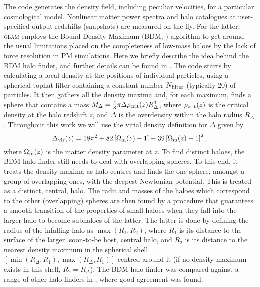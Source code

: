 The code generates the density field, including peculiar velocities, for a particular cosmological model. Nonlinear matter power spectra and halo catalogues at user-specified output redshifts (snapshots) are measured on the fly. For the latter, \textsc{glam} employs the Bound Density Maximum (BDM; \cite{Klypin:1997sk,Riebe:2011arXiv1109.0003R}) algorithm to get around the usual limitations placed on the completeness of low-mass haloes by the lack of force resolution in PM simulations. Here we briefly describe the idea behind the BDM halo finder, and further details can be found in \cite{Riebe:2011arXiv1109.0003R,Knebe:2011MNRAS.415.2293K}. The code starts by calculating a local density at the positions of individual particles, using a spherical tophat filter containing a constant number $N_{\rm filter}$ (typically 20) of particles. It then gathers all the density maxima and, for each maximum, finds a sphere that contains a mass $M_\Delta = \frac{4}{3}\pi\Delta\rho_{\rm crit}(z)R_\Delta^3$, where $\rho_{\rm crit}(z)$ is the critical density at the halo redshift $z$, and $\Delta$ is the overdensity within the halo radius $R_\Delta$. Throughout this work we will use the virial density definition for $\Delta$ given by \cite{Bryan:1997dn}
\begin{equation}
    \Delta_{\rm vir}(z) = 18\pi^2 + 82\left[\Omega_{\rm m}(z)-1\right] - 39\left[\Omega_{\rm m}(z)-1\right]^2,
\end{equation}
where $\Omega_{\rm m}(z)$ is the matter density parameter at $z$. To find distinct haloes, the BDM halo finder still needs to deal with overlapping spheres. To this end, it treats the density maxima as halo centres and finds the one sphere, amongst a group of overlapping ones, with the deepest Newtonian potential. This is treated as a distinct, central, halo. The radii and masses of the haloes which correspond to the other (overlapping) spheres are then found by a procedure that guarantees a smooth transition of the properties of small haloes when they fall into the larger halo to become subhaloes of the latter. The latter is done by defining the radius of the infalling halo as $\max(R_1, R_2)$, where $R_1$ is its distance to the surface of the larger, soon-to-be host, central halo, and $R_2$ is its distance to the nearest density maximum in the spherical shell  $[\min(R_\Delta,R_1),\max(R_\Delta,R_1)]$ centred around it (if no density maximum exists in this shell, $R_2=R_\Delta$). The BDM halo finder was compared against a range of other halo finders in \cite{Knebe:2011MNRAS.415.2293K}, where good agreement was found. 

